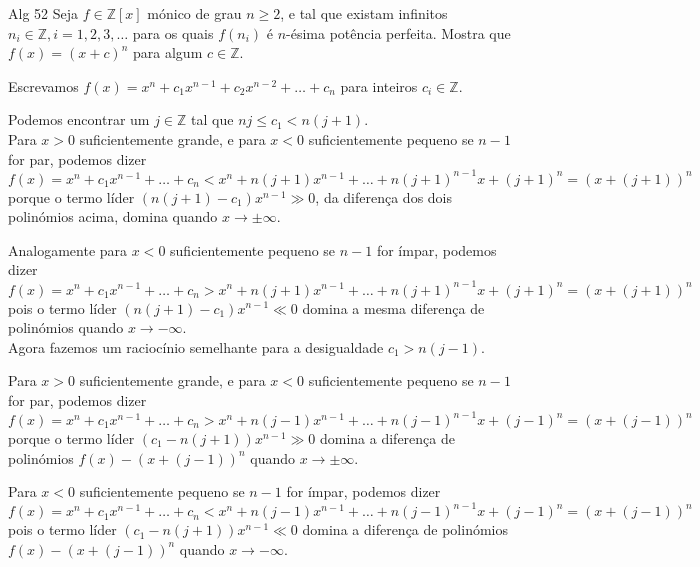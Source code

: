 \documentclass[main.tex]{subfiles}
\begin{document}
\begin{problem}{Alg 52}
Seja $f\in\mathbb{Z}[x]$ mónico de grau $n\geq 2$, e tal que existam infinitos
$n_i\in\mathbb{Z}, i=1,2,3,\dots$ para os quais $f(n_i)$ é $n$-ésima potência
perfeita. Mostra que $f(x)=(x+c)^n$ para algum $c\in\mathbb{Z}$.
\end{problem}

\begin{solution}
Escrevamos $f(x)=x^n+c_1x^{n-1}+c_2x^{n-2}+\dots+c_n$
para inteiros $c_i\in\mathbb{Z}$.

Podemos encontrar um $j\in\mathbb{Z}$ tal que $nj\leq c_1<n(j+1)$.
\\

Para $x>0$ suficientemente grande, e para $x<0$ suficientemente pequeno
se $n-1$ for par, podemos dizer
\begin{equation*}
f(x)=x^n+c_1x^{n-1}+\dots+c_n
<x^n+n(j+1)x^{n-1}+\dots+n(j+1)^{n-1}x+(j+1)^n
=(x+(j+1))^n
\end{equation*}
porque o termo líder $(n(j+1)-c_1)x^{n-1}\gg 0$, da diferença dos dois
polinómios acima, domina quando $x\to\pm\infty$.

Analogamente para $x<0$ suficientemente pequeno se $n-1$ for ímpar,
podemos dizer
\begin{equation*}
f(x)=x^n+c_1x^{n-1}+\dots+c_n
>x^n+n(j+1)x^{n-1}+\dots+n(j+1)^{n-1}x+(j+1)^n
=(x+(j+1))^n
\end{equation*}
pois o termo líder $(n(j+1)-c_1)x^{n-1}\ll 0$ domina a mesma diferença de polinómios quando $x\to -\infty$.
\\

Agora fazemos um raciocínio semelhante para a desigualdade $c_1>n(j-1)$.

Para $x>0$ suficientemente grande, e para $x<0$ suficientemente pequeno
se $n-1$ for par, podemos dizer
\begin{equation*}
f(x)=x^n+c_1x^{n-1}+\dots+c_n
>x^n+n(j-1)x^{n-1}+\dots+n(j-1)^{n-1}x+(j-1)^n
=(x+(j-1))^n
\end{equation*}
porque o termo líder $(c_1-n(j+1))x^{n-1}\gg 0$ domina a diferença de polinómios
$f(x)-(x+(j-1))^n$ quando $x\to\pm\infty$.

Para $x<0$ suficientemente pequeno se $n-1$ for ímpar, podemos dizer
\begin{equation*}
f(x)=x^n+c_1x^{n-1}+\dots+c_n
<x^n+n(j-1)x^{n-1}+\dots+n(j-1)^{n-1}x+(j-1)^n
=(x+(j-1))^n
\end{equation*}
pois o termo líder $(c_1-n(j+1))x^{n-1}\ll 0$ domina a diferença de polinómios
$f(x)-(x+(j-1))^n$ quando $x\to -\infty$.
\\


\end{solution}
\end{document}
